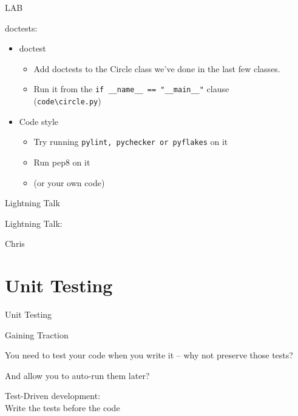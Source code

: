 \documentclass{beamer}
\begin{document}
\begin{frame}[fragile]{LAB}

{\Large doctests:}

\begin{itemize}
  \item doctest
    \begin{itemize}
       \item Add doctests to the Circle class we've done in the last few classes.
       \item Run it from the \verb|if __name__ == "__main__"| clause\\
             (\verb|code\circle.py|)
    \end{itemize}
  \item Code style
    \begin{itemize}
       \item Try running \verb|pylint, pychecker or pyflakes| on it 
       \item Run pep8 on it
       \item (or your own code)
    \end{itemize}

\end{itemize}

\end{frame}

\begin{frame}{Lightning Talk}

{\centering

\vfill
{\LARGE Lightning Talk:  }

\vfill
{\Huge Chris}

\vfill
}
\end{frame}

\section{Unit Testing}

\begin{frame}[fragile]{Unit Testing}

{\LARGE Gaining Traction}

\vfill
{\Large You need to test your code when you write it -- why not preserve those tests?}

\vfill
{\Large And allow you to auto-run them later?}

\vfill
{\LARGE Test-Driven development:}\\[0.1in]
{\Large \hspace{0.3in} Write the tests before the code}

\end{frame} 
\end{document}
